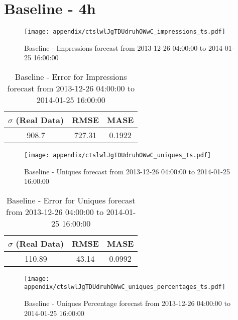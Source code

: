 \section{Baseline - 4h}
\begin{figure}[H] \begin{center} \leavevmode
\texttt{[image: appendix/ctslwlJgTDUdruhOWwC\_impressions\_ts.pdf]} \caption[]{
Baseline - Impressions forecast from 2013-12-26 04:00:00 to 2014-01-25 16:00:00} \label{fig:appendix/ctslwlJgTDUdruhOWwC_impressions_ts.pdf} \end{center}
\end{figure}

\begin{table}[H]
\centering
\footnotesize
\begin{tabular}{ccc}
$\sigma$ (Real Data) & RMSE & MASE   \\ \hline
908.7 & 727.31 & 0.1922 \\
\end{tabular}

\vspace{0.5cm}

\caption[]{
Baseline - Error for Impressions forecast from 2013-12-26 04:00:00 to 2014-01-25 16:00:00}
\end{table}

\begin{figure}[H] \begin{center} \leavevmode
\texttt{[image: appendix/ctslwlJgTDUdruhOWwC\_uniques\_ts.pdf]} \caption[]{
Baseline - Uniques forecast from 2013-12-26 04:00:00 to 2014-01-25 16:00:00} \label{fig:appendix/ctslwlJgTDUdruhOWwC_uniques_ts.pdf} \end{center}
\end{figure}

\begin{table}[H]
\centering
\footnotesize
\begin{tabular}{ccc}
$\sigma$ (Real Data) & RMSE & MASE   \\ \hline
110.89 & 43.14 & 0.0992 \\
\end{tabular}

\vspace{0.5cm}

\caption[]{
Baseline - Error for Uniques forecast from 2013-12-26 04:00:00 to 2014-01-25 16:00:00}
\end{table}

\begin{figure}[H] \begin{center} \leavevmode
\texttt{[image: appendix/ctslwlJgTDUdruhOWwC\_uniques\_percentages\_ts.pdf]} \caption[]{
Baseline - Uniques Percentage forecast from 2013-12-26 04:00:00 to 2014-01-25 16:00:00} \label{fig:appendix/ctslwlJgTDUdruhOWwC_uniques_percentages_ts.pdf} \end{center}
\end{figure}

